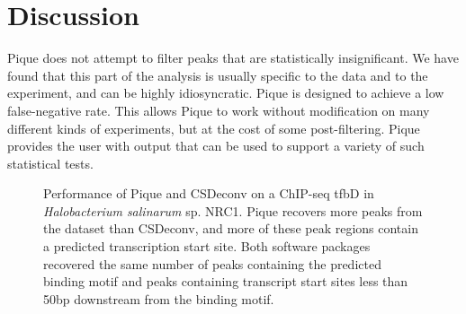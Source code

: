 \documentclass{bioinfo}
\begin{document}
\section{Discussion}

Pique does not attempt to filter peaks that are statistically
insignificant. We have found that this part of the analysis is usually
specific to the data and to the experiment, and can be highly
idiosyncratic. Pique is designed to achieve a low false-negative
rate. This allows Pique to work without modification on many different
kinds of experiments, but at the cost of some post-filtering. Pique
provides the user with output that can be used to support a variety of
such statistical tests.

\begin{figure}
  \begin{center}
    {}
  \end{center}
  \caption{Performance of Pique and CSDeconv on a ChIP-seq tfbD in
    {\em Halobacterium salinarum} sp. NRC1. Pique recovers more peaks
    from the dataset than CSDeconv, and more of these peak regions
    contain a predicted transcription start site. Both software
    packages recovered the same number of peaks containing the
    predicted binding motif and peaks containing transcript start
    sites less than 50bp downstream from the binding
    motif.}\label{fig:02}
\end{figure}
\end{document}
